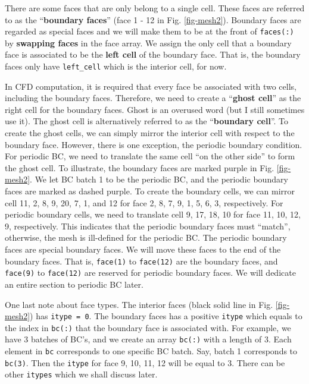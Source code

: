 \documentclass[12pt, letterpaper]{report}
\begin{document}
There are some faces that are only belong to a single cell. These faces are referred to as the
``{\bf boundary faces}'' (face 1 - 12 in Fig. \ref{fig-mesh2}). Boundary faces are regarded as
special faces and we will make them to be at the front of \verb+faces(:)+ by {\bf swapping faces} in the
face array. We assign the only cell
that a boundary face is associated to be the {\bf left cell} of the boundary face. That is, the
boundary faces only have \verb+left_cell+ which is the interior cell, for now.
\paraspace

In CFD computation, it is required that every face be associated with two cells, including the
boundary faces. Therefore, we need to create a ``{\bf ghost cell}'' as the right cell for the
boundary faces. Ghost is an overused word (but I still sometimes use it). The ghost cell is
alternatively referred to as the ``{\bf boundary cell}''. To create the ghost cells, we can simply
mirror the interior cell with respect to the boundary face. However, there is one exception, the
periodic boundary condition. For periodic BC, we need to translate the same cell ``on the other
side'' to form the ghost cell. To illustrate, the boundary faces are marked purple in Fig.
\ref{fig-mesh2}. We let BC batch 1 to be the periodic BC, and the periodic boundary faces are marked
as dashed purple. To create the boundary cells, we can mirror cell 11, 2, 8, 9, 20, 7, 1, and 12 for
face 2, 8, 7, 9, 1, 5, 6,  3, respectively. For periodic boundary cells, we need to translate cell
9, 17, 18, 10 for face 11, 10, 12, 9, respectively. This indicates that the periodic boundary faces
must ``match'', otherwise, the mesh is ill-defined for the periodic BC. The periodic boundary faces
are special boundary faces. We will move these faces to the end of the boundary faces. That is,
\verb+face(1)+ to \verb+face(12)+ are the boundary faces, and \verb+face(9)+ to \verb+face(12)+ are
reserved for periodic boundary faces.  We will dedicate an entire section to periodic BC later.
\paraspace

One last note about face types. The interior faces (black solid line in Fig. \ref{fig-mesh2}) has
\verb+itype = 0+. The boundary faces has a positive \verb+itype+ which equals to the index in
\verb+bc(:)+ that the boundary face is associated with. For example, we have 3 batches of BC's, and
we create an array \verb+bc(:)+ with a length of 3. Each element in \verb+bc+ corresponds to one
specific BC batch. Say, batch 1 corresponds to \verb+bc(3)+. Then the \verb+itype+ for face 9, 10, 11,
12 will be equal to 3. There can be other \verb+itypes+ which we shall discuss later.
\paraspace
\end{document}
